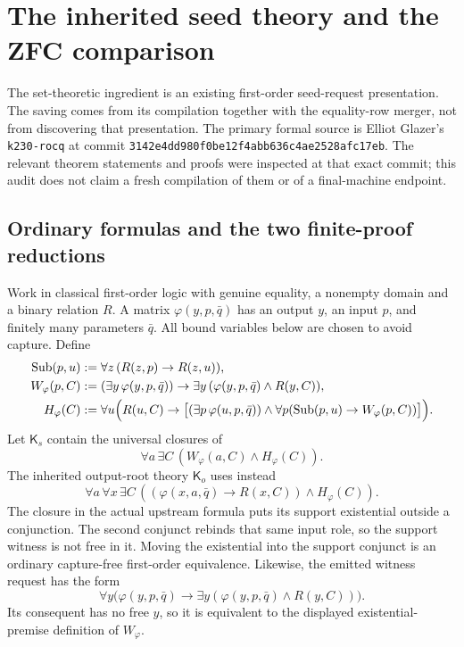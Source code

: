 \section{The inherited seed theory and the ZFC comparison}
\label{sec:seed-calibration-audit}

The set-theoretic ingredient is an existing first-order seed-request
presentation.  The saving comes from its compilation together with the
equality-row merger, not from discovering that presentation.  The primary
formal source is Elliot Glazer's \texttt{k230-rocq} at commit
\texttt{3142e4dd980f0be12f4abb636c4ae2528afc17eb}.  The relevant theorem
statements and proofs were inspected at that exact commit; this audit
does not claim a fresh compilation of them or of a final-machine
endpoint.

\subsection{Ordinary formulas and the two finite-proof reductions}

Work in classical first-order logic with genuine equality, a nonempty
domain and a binary relation $R$.  A matrix
$\varphi(y,p,\bar q)$ has an output $y$, an input $p$, and finitely
many parameters $\bar q$.  All bound variables below are chosen to avoid
capture.  Define
\begin{align*}
 \operatorname{Sub}(p,u)
   &:=\forall z\,(R(z,p)\to R(z,u)),\\
 W_\varphi(p,C)
   &:=(\exists y\,\varphi(y,p,\bar q))\to
        \exists y\,(\varphi(y,p,\bar q)\land R(y,C)),\\
 H_\varphi(C)
   &:=\forall u\Bigl(R(u,C)\to
       \bigl[(\exists p\,\varphi(u,p,\bar q))\land
         \forall p(\operatorname{Sub}(p,u)\to W_\varphi(p,C))\bigr]\Bigr).
\end{align*}
Let $\mathsf K_s$ contain the universal closures of
\[
       \forall a\,\exists C\,
            (W_\varphi(a,C)\land H_\varphi(C)).
                                                        \tag{S}
\]
The inherited output-root theory $\mathsf K_o$ uses instead
\[
 \forall a\,\forall x\,\exists C\,
       ((\varphi(x,a,\bar q)\to R(x,C))\land H_\varphi(C)).
                                                        \tag{O}
\]
The closure in the actual upstream formula puts its support existential
outside a conjunction.  The second conjunct rebinds that same input
role, so the support witness is not free in it.  Moving the existential
into the support conjunct is an ordinary capture-free first-order
equivalence.  Likewise, the emitted witness request has the form
\[
 \forall y\bigl(\varphi(y,p,\bar q)\to
             \exists y(\varphi(y,p,\bar q)\land R(y,C))\bigr).
\]
Its consequent has no free $y$, so it is equivalent to the displayed
existential-premise definition of $W_\varphi$.

